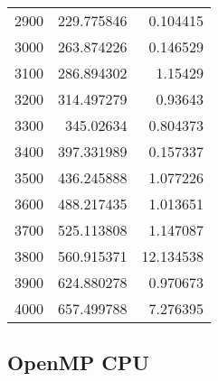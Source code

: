 \begin{longtable}{r r r}
2900 & 229.775846 & 0.104415 \\
3000 & 263.874226 & 0.146529 \\
3100 & 286.894302 & 1.15429 \\
3200 & 314.497279 & 0.93643 \\
3300 & 345.02634 & 0.804373 \\
3400 & 397.331989 & 0.157337 \\
3500 & 436.245888 & 1.077226 \\
3600 & 488.217435 & 1.013651 \\
3700 & 525.113808 & 1.147087 \\
3800 & 560.915371 & 12.134538 \\
3900 & 624.880278 & 0.970673 \\
4000 & 657.499788 & 7.276395 \\
\end{longtable}

\subsection*{OpenMP CPU}

